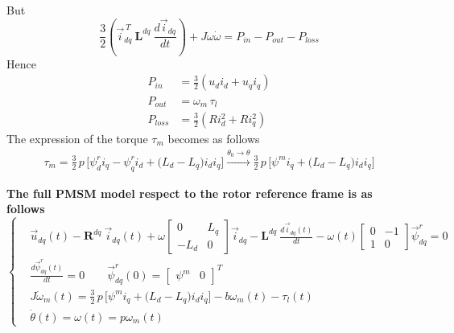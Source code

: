 \documentclass[12pt,a4paper]{scrartcl}
\begin{document}
\begin{onehalfspace}
\begin{equation*}
\end{equation*}
But 
\begin{equation*}
	\frac{3}{2} \left( \vec{i}_{dq}^{\ T}\ \mathbf{L}^{dq}\ \frac{d\vec{i}_{dq}}{dt}\right) + J\omega\dot{\omega}= P_{in}-P_{out}-P_{loss}
\end{equation*}
Hence
\begin{equation*}
	\begin{aligned}
		P_{in} &= \frac{3}{2}\left( u_d i_d+u_q i_q\right)  \\[6pt]
		P_{out} &= \omega_m\,\tau_l \\[6pt]
		P_{loss} &= \frac{3}{2}\left( Ri_d^2+Ri_q^2\right) 
	\end{aligned} 
\end{equation*}
The expression of the torque $\tau_m$ becomes as follows
\begin{equation}
	\begin{aligned}
		\tau_m = \frac{3}{2}\,p\,\Big[\psi^r_{d}i_{q}-\psi^r_{q}i_{d} + \big(L_d-L_q\big)i_di_q\Big] \xrightarrow{\theta_0\rightarrow\theta} \frac{3}{2}\,p\,\Big[\psi^mi_{q} + \big(L_d-L_q\big)i_di_q\Big]
	\end{aligned} 
\end{equation}

\begin{mybox}
	\textbf{The full PMSM model respect to the rotor reference frame is as follows}
	\begin{equation}\label{twophase_model_ref_2}
		\left\lbrace \begin{aligned}
			& \vec{u}_{dq}(t)-\mathbf{R}^{dq}\ \vec{i}_{dq}(t)+ \omega\begin{bmatrix} 0 & L_q\\ -L_d & 0 \end{bmatrix}\vec{i}_{dq} -\mathbf{L}^{dq}\ \frac{d\vec{i}_{dq}(t)}{dt}-\omega(t) \begin{bmatrix} 0 & -1 \\ 1 & 0\end{bmatrix} \vec{\psi}^r_{dq} = 0 \\[6pt]
			& \frac{d\vec{\psi}^r_{dq}(t)}{dt} = 0 \qquad \vec{\psi}^r_{dq}(0) = \begin{bmatrix} \psi^m &  0 \end{bmatrix}^T \\[6pt]
			& J\dot{\omega}_m(t) = \frac{3}{2}\,p\,\Big[\psi^mi_{q} + \big(L_d-L_q\big)i_di_q\Big] -b\omega_m(t)-\tau_l(t) \\[6pt]
			& \dot{\theta}(t) = \omega(t) = p\omega_m(t)
		\end{aligned} \right. 
	\end{equation}
\end{mybox}

\end{onehalfspace}
\end{document}
